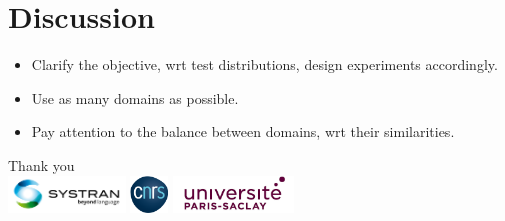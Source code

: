\documentclass{beamer}
\newcommand{\fyTodo}[1]{\Todo[FY:]{\textcolor{orange}{#1}}}
\begin{document}
\section{Discussion} %

\begin{frame}
\begin{itemize}
	
	\item Clarify the objective, wrt test distributions, design experiments accordingly.	
	\item Use as many domains as possible.
	\item Pay attention to the balance between domains, wrt their similarities.
	
	
\end{itemize}
\end{frame}

\begin{frame}

\centering
\Huge
Thank you \\
\vspace{1.5cm}
    \includegraphics[height=1.0cm]{systran-logo.png}
    \includegraphics[height=1.0cm]{cnrs-logo.png}
    \includegraphics[height=1.0cm]{ups-logo.png}
\end{frame}


\end{document}

